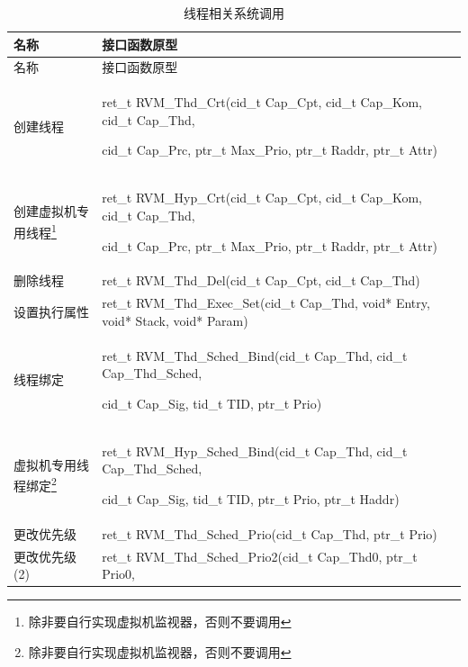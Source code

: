 \begin{xltabular}{\textwidth}{@{}>{\hsize\raggedright\arraybackslash}X>{\hsize\raggedright\arraybackslash}X@{}}
\caption{线程相关系统调用}\label{tab:3-9}\\
\toprule
名称 & 接口函数原型\tabularnewline
\endfirsthead
\toprule
名称 & 接口函数原型\tabularnewline
\midrule
\endhead
\bottomrule
\endlastfoot
创建线程\strut
 & ret\_\allowbreak{}t RVM\_\allowbreak{}Thd\_\allowbreak{}Crt(cid\_\allowbreak{}t Cap\_\allowbreak{}Cpt, cid\_\allowbreak{}t Cap\_\allowbreak{}Kom, cid\_\allowbreak{}t Cap\_\allowbreak{}Thd,

cid\_\allowbreak{}t Cap\_\allowbreak{}Prc, ptr\_\allowbreak{}t Max\_\allowbreak{}Prio, ptr\_\allowbreak{}t Raddr, ptr\_\allowbreak{}t Attr)\strut
\tabularnewline
创建虚拟机专用线程\footnote{除非要自行实现虚拟机监视器，否则不要调用}\strut
 & ret\_\allowbreak{}t RVM\_\allowbreak{}Hyp\_\allowbreak{}Crt(cid\_\allowbreak{}t Cap\_\allowbreak{}Cpt, cid\_\allowbreak{}t Cap\_\allowbreak{}Kom, cid\_\allowbreak{}t Cap\_\allowbreak{}Thd,

cid\_\allowbreak{}t Cap\_\allowbreak{}Prc, ptr\_\allowbreak{}t Max\_\allowbreak{}Prio, ptr\_\allowbreak{}t Raddr, ptr\_\allowbreak{}t Attr)\strut
\tabularnewline
删除线程 & ret\_\allowbreak{}t RVM\_\allowbreak{}Thd\_\allowbreak{}Del(cid\_\allowbreak{}t Cap\_\allowbreak{}Cpt, cid\_\allowbreak{}t
Cap\_\allowbreak{}Thd)\tabularnewline
设置执行属性 & ret\_\allowbreak{}t RVM\_\allowbreak{}Thd\_\allowbreak{}Exec\_\allowbreak{}Set(cid\_\allowbreak{}t Cap\_\allowbreak{}Thd, void* Entry,
void* Stack, void* Param)\tabularnewline
线程绑定\strut
 & ret\_\allowbreak{}t RVM\_\allowbreak{}Thd\_\allowbreak{}Sched\_\allowbreak{}Bind(cid\_\allowbreak{}t Cap\_\allowbreak{}Thd, cid\_\allowbreak{}t Cap\_\allowbreak{}Thd\_\allowbreak{}Sched,

cid\_\allowbreak{}t Cap\_\allowbreak{}Sig, tid\_\allowbreak{}t TID, ptr\_\allowbreak{}t Prio)\strut
\tabularnewline
虚拟机专用线程绑定\footnote{除非要自行实现虚拟机监视器，否则不要调用}\strut
 & ret\_\allowbreak{}t RVM\_\allowbreak{}Hyp\_\allowbreak{}Sched\_\allowbreak{}Bind(cid\_\allowbreak{}t Cap\_\allowbreak{}Thd, cid\_\allowbreak{}t Cap\_\allowbreak{}Thd\_\allowbreak{}Sched,

cid\_\allowbreak{}t Cap\_\allowbreak{}Sig, tid\_\allowbreak{}t TID, ptr\_\allowbreak{}t Prio, ptr\_\allowbreak{}t Haddr)\strut
\tabularnewline
更改优先级 & ret\_\allowbreak{}t RVM\_\allowbreak{}Thd\_\allowbreak{}Sched\_\allowbreak{}Prio(cid\_\allowbreak{}t Cap\_\allowbreak{}Thd, ptr\_\allowbreak{}t
Prio)\tabularnewline
更改优先级(2)\strut
 & ret\_\allowbreak{}t RVM\_\allowbreak{}Thd\_\allowbreak{}Sched\_\allowbreak{}Prio2(cid\_\allowbreak{}t Cap\_\allowbreak{}Thd0, ptr\_\allowbreak{}t Prio0,


\end{xltabular}

